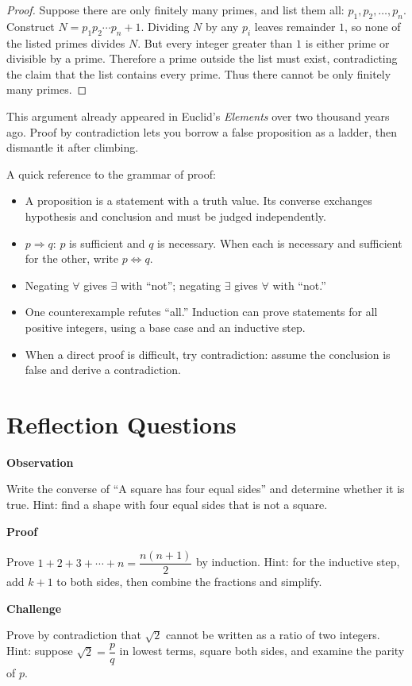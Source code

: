 \begin{proof}
Suppose there are only finitely many primes, and list them all: $p_1,p_2,\dots,p_n$. Construct $N=p_1p_2\cdots p_n+1$. Dividing $N$ by any $p_i$ leaves remainder $1$, so none of the listed primes divides $N$. But every integer greater than $1$ is either prime or divisible by a prime. Therefore a prime outside the list must exist, contradicting the claim that the list contains every prime. Thus there cannot be only finitely many primes.
\end{proof}

This argument already appeared in Euclid's \emph{Elements} over two thousand years ago. Proof by contradiction lets you borrow a false proposition as a ladder, then dismantle it after climbing.

\begin{toolbox}
A quick reference to the grammar of proof:
\begin{itemize}
\item A proposition is a statement with a truth value. Its converse exchanges hypothesis and conclusion and must be judged independently.
\item $p\Rightarrow q$: $p$ is sufficient and $q$ is necessary. When each is necessary and sufficient for the other, write $p\Leftrightarrow q$.
\item Negating $\forall$ gives $\exists$ with ``not''; negating $\exists$ gives $\forall$ with ``not.''
\item One counterexample refutes ``all.'' Induction can prove statements for all positive integers, using a base case and an inductive step.
\item When a direct proof is difficult, try contradiction: assume the conclusion is false and derive a contradiction.
\end{itemize}
\end{toolbox}

\section*{Reflection Questions}

\textbf{Observation}
\begin{sikao}
\item Write the converse of ``A square has four equal sides'' and determine whether it is true. Hint: find a shape with four equal sides that is not a square.
\end{sikao}

\textbf{Proof}
\begin{sikao}
\item Prove $1+2+3+\cdots+n=\dfrac{n(n+1)}{2}$ by induction. Hint: for the inductive step, add $k+1$ to both sides, then combine the fractions and simplify.
\end{sikao}

\textbf{Challenge}
\begin{sikao}
\item Prove by contradiction that $\sqrt{2}$ cannot be written as a ratio of two integers. Hint: suppose $\sqrt{2}=\dfrac{p}{q}$ in lowest terms, square both sides, and examine the parity of $p$.
\end{sikao}
